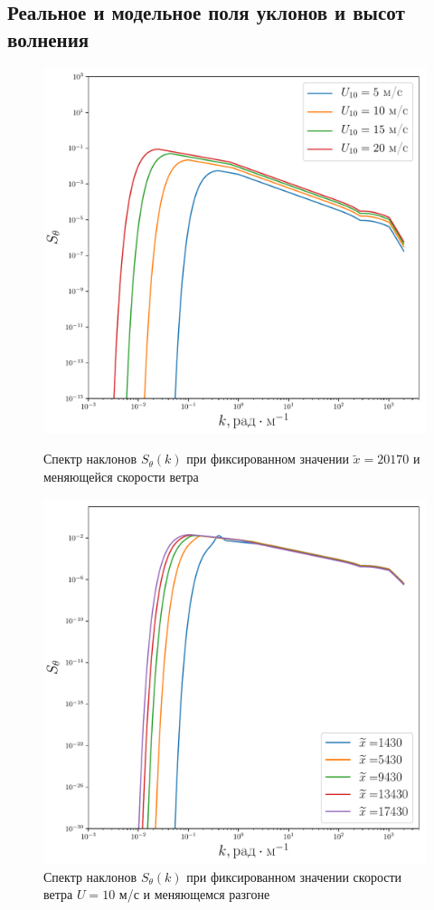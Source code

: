 \subsection{Реальное и модельное поля уклонов и высот волнения}
\begin{figure}[h!]
	\begin{minipage}{0.49\linewidth}
			\centering
			\includegraphics[width=\linewidth]{fig/full_spectrum3.pdf}
			\caption{Спектр наклонов $S_{\theta}(k)$ при фиксированном значении $\tilde x=20170$ и меняющейся скорости ветра}		
			\label{fig:full_spectrum3}
	\end{minipage}
	\hfill
	\begin{minipage}{0.49\linewidth}
			\centering
			\includegraphics[width=\linewidth]{fig/full_spectrum4.pdf}
			\caption{Спектр наклонов $S_{\theta}(k)$ при фиксированном значении скорости ветра 
			$U=10$ м/с и меняющемся разгоне}		
			\label{fig:full_spectrum4}
	\end{minipage}
\end{figure}
